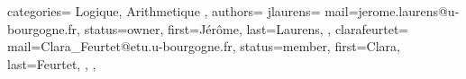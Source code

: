 {
  categories={
    Logique, Arithmetique
  },
  authors={
    jlaurens={
      mail=jerome.laurens@u-bourgogne.fr,
      status=owner,
      first=Jérôme,
      last=Laurens,
    },
   clarafeurtet={
      mail=Clara_Feurtet@etu.u-bourgogne.fr,
      status=member,
      first=Clara,
      last=Feurtet,
    },
  },
}
